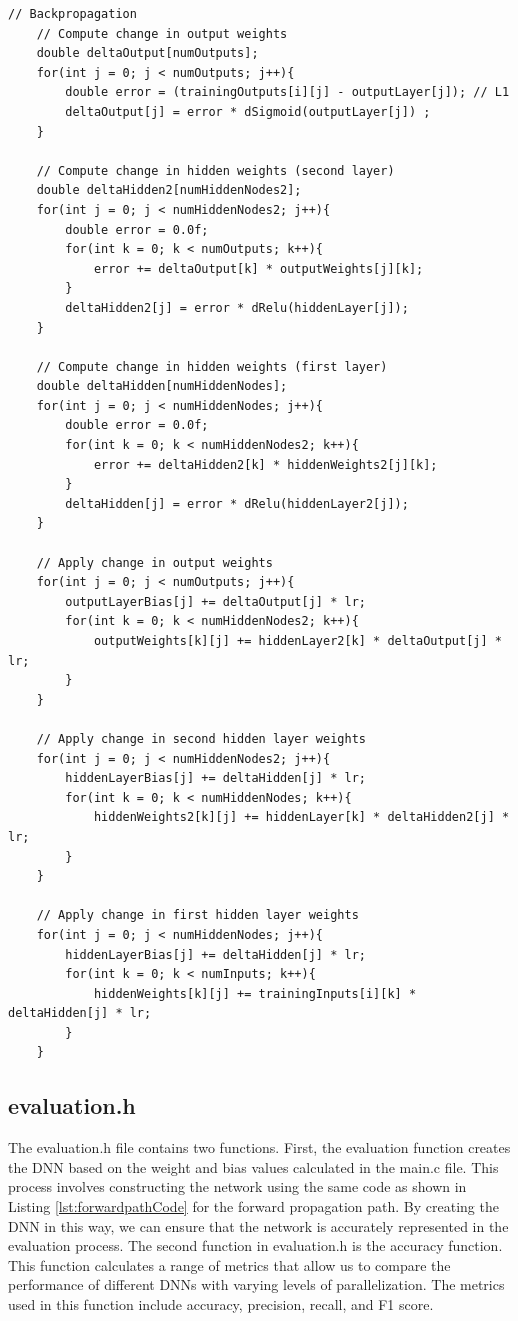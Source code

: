 \documentclass[11pt]{article}
\begin{document}
\begin{lstlisting}[style=CStyle, caption={Backward path of main.c}, label={lst:backwardpathCode}]
    // Backpropagation
    // Compute change in output weights
    double deltaOutput[numOutputs];
    for(int j = 0; j < numOutputs; j++){
        double error = (trainingOutputs[i][j] - outputLayer[j]); // L1
        deltaOutput[j] = error * dSigmoid(outputLayer[j]) ;
    }

    // Compute change in hidden weights (second layer)
    double deltaHidden2[numHiddenNodes2];
    for(int j = 0; j < numHiddenNodes2; j++){
        double error = 0.0f;
        for(int k = 0; k < numOutputs; k++){
            error += deltaOutput[k] * outputWeights[j][k];
        }
        deltaHidden2[j] = error * dRelu(hiddenLayer[j]);
    }

    // Compute change in hidden weights (first layer)
    double deltaHidden[numHiddenNodes];
    for(int j = 0; j < numHiddenNodes; j++){
        double error = 0.0f;
        for(int k = 0; k < numHiddenNodes2; k++){
            error += deltaHidden2[k] * hiddenWeights2[j][k];
        }
        deltaHidden[j] = error * dRelu(hiddenLayer2[j]);
    }

    // Apply change in output weights
    for(int j = 0; j < numOutputs; j++){
        outputLayerBias[j] += deltaOutput[j] * lr;
        for(int k = 0; k < numHiddenNodes2; k++){
            outputWeights[k][j] += hiddenLayer2[k] * deltaOutput[j] * lr;
        }
    }

    // Apply change in second hidden layer weights
    for(int j = 0; j < numHiddenNodes2; j++){
        hiddenLayerBias[j] += deltaHidden[j] * lr;
        for(int k = 0; k < numHiddenNodes; k++){
            hiddenWeights2[k][j] += hiddenLayer[k] * deltaHidden2[j] * lr;
        }
    }

    // Apply change in first hidden layer weights
    for(int j = 0; j < numHiddenNodes; j++){
        hiddenLayerBias[j] += deltaHidden[j] * lr;
        for(int k = 0; k < numInputs; k++){
            hiddenWeights[k][j] += trainingInputs[i][k] * deltaHidden[j] * lr;
        }
    }
\end{lstlisting}

\subsection{evaluation.h}
The evaluation.h file contains two functions. First, the evaluation function creates the DNN based on the weight and bias values calculated in the main.c file. This process involves constructing the network using the same code as shown in Listing \ref{lst:forwardpathCode} for the forward propagation path. By creating the DNN in this way, we can ensure that the network is accurately represented in the evaluation process. The second function in evaluation.h is the accuracy function. This function calculates a range of metrics that allow us to compare the performance of different DNNs with varying levels of parallelization. The metrics used in this function include accuracy, precision, recall, and F1 score. 
\end{document}
